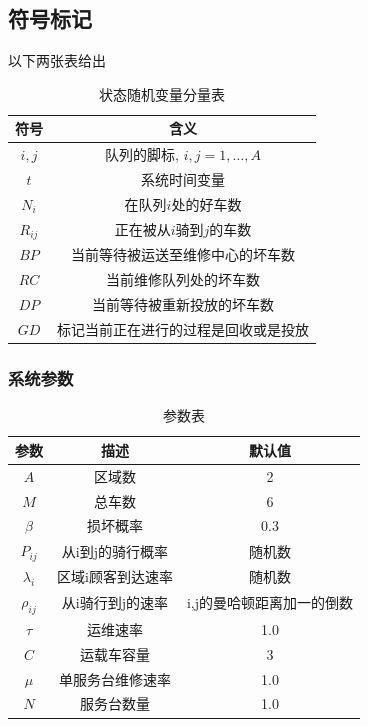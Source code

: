 \documentclass{article}
\begin{document}
\subsection{符号标记}
以下两张表给出
\begin{table}[H]
    \centering
    \caption{状态随机变量分量表}
    \begin{tabular}{ |c|c| } 
     \hline
     符号 & 含义 \\ 
     \hline
     $i, j$ & 队列的脚标, $i,j = 1, \dots, A$ \\ 
     \hline
     $t$ & 系统时间变量\\ 
     \hline
     $N_i$ & 在队列$i$处的好车数\\
     \hline
     $R_{ij}$ & 正在被从$i$骑到$j$的车数 \\ 
     \hline
     $BP$ & 当前等待被运送至维修中心的坏车数 \\
     \hline
     $RC$ & 当前维修队列处的坏车数 \\
     \hline
     $DP$ & 当前等待被重新投放的坏车数 \\
     \hline
     $GD$ & 标记当前正在进行的过程是回收或是投放 \\
     \hline
    \end{tabular}
    \label{tab:rv}
\end{table}

\subsubsection{系统参数}
\begin{table}[H]
    \centering
    \caption{参数表}
    \begin{tabular}{ |c|c|c| } 
     \hline
     参数 & 描述 & 默认值 \\ 
     \hline
     $A$ & 区域数 & 2 \\ 
     \hline
     $M$ & 总车数 & 6 \\ 
     \hline
     $\beta$ & 损坏概率 & 0.3 \\
     \hline
     $P_{ij}$ & 从i到j的骑行概率 & 随机数 \\
     \hline
     $\lambda_i$ & 区域i顾客到达速率 & 随机数 \\
     \hline
     $\rho_{ij}$ & 从i骑行到j的速率 & i,j的曼哈顿距离加一的倒数 \\
     \hline
     $\tau$ & 运维速率 & 1.0 \\
     \hline
     $C$ & 运载车容量 & 3 \\
     \hline
     $\mu$ & 单服务台维修速率 & 1.0 \\
     \hline
     $N$ & 服务台数量 & 1.0 \\
     \hline
    \end{tabular}
    \label{tab:para}
\end{table}
\end{document}
